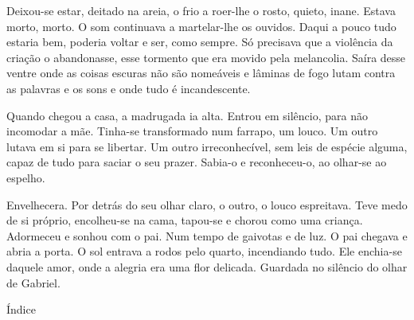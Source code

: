 Deixou-se estar, deitado na areia, o frio a roer-lhe o rosto, quieto,
inane. Estava morto, morto. O som continuava a martelar-lhe os ouvidos.
Daqui a pouco tudo estaria bem, poderia voltar e ser, como sempre. Só
precisava que a violência da criação o abandonasse, esse tormento que
era movido pela melancolia. Saíra desse ventre onde as coisas escuras
não são nomeáveis e lâminas de fogo lutam contra as palavras e os sons e
onde tudo é incandescente.

Quando chegou a casa, a madrugada ia alta. Entrou em silêncio, para não
incomodar a mãe. Tinha-se transformado num farrapo, um louco. Um outro
lutava em si para se libertar. Um outro irreconhecível, sem leis de
espécie alguma, capaz de tudo para saciar o seu prazer. Sabia-o e
reconheceu-o, ao olhar-se ao espelho.

Envelhecera. Por detrás do seu olhar claro, o outro, o louco espreitava.
Teve medo de si próprio, encolheu-se na cama, tapou-se e chorou como uma
criança. Adormeceu e sonhou com o pai. Num tempo de gaivotas e de luz. O
pai chegava e abria a porta. O sol entrava a rodos pelo quarto,
incendiando tudo. Ele enchia-se daquele amor, onde a alegria era uma
flor delicada. Guardada no silêncio do olhar de Gabriel.

Índice
